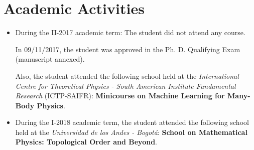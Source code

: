 \documentclass[titlepage,11pt]{article}
\theoremstyle{plain}%
\theoremstyle{definition}
\theoremstyle{remark}
\begin{document}
\section{Academic Activities}
\begin{itemize}
\item During the II-2017 academic term:
The student did not attend any course. 

In 09/11/2017, the student was approved in the Ph. D. Qualifying Exam (manuscript annexed).

Also, the student attended the following school held at the \emph{International Centre for Theoretical Physics - South American Institute Fundamental Research } (ICTP-SAIFR): \textbf{Minicourse on Machine Learning for Many-Body Physics}.
\item During the I-2018 academic term, the student attended the following school held at the \emph{Universidad de los Andes - Bogotá}: \textbf{School on Mathematical Physics: Topological Order and Beyond}.

\end{itemize}


%

\end{document}
